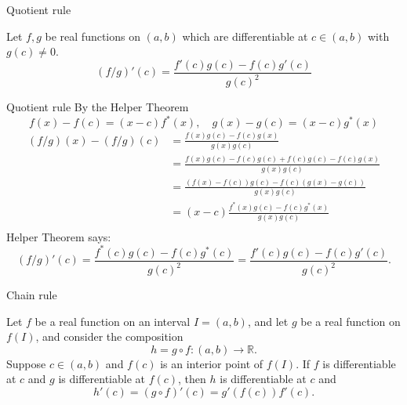 \documentclass{beamer}
\begin{document}
\begin{frame}{Quotient rule}
\begin{thm}
Let $f,g$ be real functions on $(a,b)$ which are differentiable at $c\in (a,b)$ with $g(c)\neq 0$.\\
$$(f/g)'(c) = \frac{f'(c)g(c) - f(c)g'(c)}{g(c)^2}$$
\end{thm}
\end{frame}
\begin{frame}{Quotient rule}\mbox{}
{\tiny
By the Helper Theorem
$$f(x)-f(c) = (x-c)f^*(x),\quad g(x)-g(c) = (x-c)g^*(x)$$
\pause
\begin{align*}
(f/g)(x) - (f/g)(c)
  & = \frac{f(x)g(c)-f(c)g(x)}{g(x)g(c)}\\
  & = \frac{f(x)g(c)-f(c)g(c)+f(c)g(c)-f(c)g(x)}{g(x)g(c)}\\
  & = \frac{(f(x)-f(c))g(c)-f(c)(g(x)-g(c))}{g(x)g(c)}\\
  & = (x-c)\frac{f^*(x)g(c)-f(c)g^*(x)}{g(x)g(c)}\\
\end{align*}
\pause
Helper Theorem says:
$$(f/g)'(c) = \frac{f^*(c)g(c)-f(c)g^*(c)}{g(c)^2} = \frac{f'(c)g(c)-f(c)g'(c)}{g(c)^2}.$$
}
\end{frame}

\begin{frame}{Chain rule}
\begin{thm}
Let $f$ be a real function on an interval $I = (a,b)$, and let $g$ be a real function on $f(I)$, and consider the composition
$$h = g\circ f: (a,b)\rightarrow\mathbb{R}.$$
Suppose $c\in (a,b)$ and $f(c)$ is an interior point of $f(I)$.
If $f$ is differentiable at $c$ and $g$ is differentiable at $f(c)$, then $h$ is differentiable at $c$ and
$$h'(c) = (g\circ f)'(c) = g'(f(c))f'(c).$$
\end{thm}
\end{frame}
\end{document}
